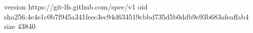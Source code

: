 version https://git-lfs.github.com/spec/v1
oid sha256:4e4e1c0b7f945a341feec3ec94d634519cbbd735d5b0ddb9e93b683afeaffab4
size 43840
